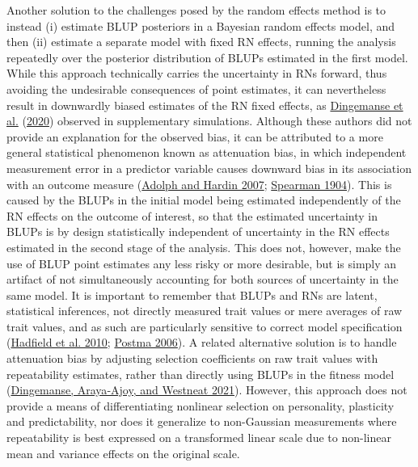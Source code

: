 \documentclass{article}
\begin{document}
Another solution to the challenges posed by the random effects method is
to instead (i) estimate BLUP posteriors in a Bayesian random effects
model, and then (ii) estimate a separate model with fixed RN effects,
running the analysis repeatedly over the posterior distribution of BLUPs
estimated in the first model. While this approach technically carries
the uncertainty in RNs forward, thus avoiding the undesirable
consequences of point estimates, it can nevertheless result in
downwardly biased estimates of the RN fixed effects, as
\protect\hyperlink{ref-Ding2020b}{Dingemanse et al.}
(\protect\hyperlink{ref-Ding2020b}{2020}) observed in supplementary
simulations. Although these authors did not provide an explanation for
the observed bias, it can be attributed to a more general statistical
phenomenon known as attenuation bias, in which independent measurement
error in a predictor variable causes downward bias in its association
with an outcome measure (\protect\hyperlink{ref-Adolf2007}{Adolph and
Hardin 2007}; \protect\hyperlink{ref-Spearman1904}{Spearman 1904}). This
is caused by the BLUPs in the initial model being estimated
independently of the RN effects on the outcome of interest, so that the
estimated uncertainty in BLUPs is by design statistically independent of
uncertainty in the RN effects estimated in the second stage of the
analysis. This does not, however, make the use of BLUP point estimates
any less risky or more desirable, but is simply an artifact of not
simultaneously accounting for both sources of uncertainty in the same
model. It is important to remember that BLUPs and RNs are latent,
statistical inferences, not directly measured trait values or mere
averages of raw trait values, and as such are particularly sensitive to
correct model specification
(\protect\hyperlink{ref-Hadfield2010}{Hadfield et al. 2010};
\protect\hyperlink{ref-Postma2006}{Postma 2006}). A related alternative
solution is to handle attenuation bias by adjusting selection
coefficients on raw trait values with repeatability estimates, rather
than directly using BLUPs in the fitness model
(\protect\hyperlink{ref-Ding2021}{Dingemanse, Araya‐Ajoy, and Westneat
2021}). However, this approach does not provide a means of
differentiating nonlinear selection on personality, plasticity and
predictability, nor does it generalize to non-Gaussian measurements
where repeatability is best expressed on a transformed linear scale due
to non-linear mean and variance effects on the original scale.
\end{document}
